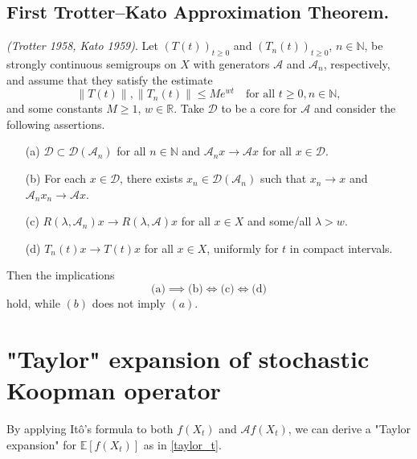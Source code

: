 \documentclass{article}[11]
\begin{document}
\subsection*{First Trotter--Kato Approximation Theorem.} 
\textit{(Trotter 1958, Kato 1959)}. Let $(T(t))_{t\geq0}$ and $(T_n(t))_{t\geq0}$, $n \in \mathbb{N}$, be strongly continuous semigroups on $X$ with generators $\mathcal{A}$ and $\mathcal{A}_n$, respectively, and assume that they satisfy the estimate
\[
\|T(t)\|, \|T_n(t)\| \leq Me^{wt} \quad \text{for all } t \geq 0, n \in \mathbb{N},
\]
and some constants $M \geq 1$, $w \in \mathbb{R}$. Take $\mathcal{D}$ to be a core for $\mathcal{A}$ and consider the following assertions.
\begin{itemize}
	\item[(a)] $\mathcal{D} \subset \mathcal{D}(\mathcal{A}_n)$ for all $n \in \mathbb{N}$ and $\mathcal{A}_n x \to \mathcal{A} x$ for all $x \in \mathcal{D}$.
	\item[(b)] For each $x \in \mathcal{D}$, there exists $x_n \in \mathcal{D}(\mathcal{A}_n)$ such that $x_n \to x$ and $\mathcal{A}_n x_n \to \mathcal{A} x$.
	\item[(c)] $R(\lambda, \mathcal{A}_n)x \to R(\lambda, \mathcal{A})x$ for all $x \in X$ and some/all $\lambda > w$.
	\item[(d)] $T_n(t)x \to T(t)x$ for all $x \in X$, uniformly for $t$ in compact intervals.
\end{itemize}
Then the implications
\[
\text{(a)} \implies \text{(b)} \iff \text{(c)} \iff \text{(d)}
\]
hold, while $(b)$ does not imply $(a)$.






\appendix
\newpage
\section{"Taylor" expansion of stochastic Koopman operator}\label{expansion_Ito_formula}
By applying It\^{o}'s formula to both \( f(X_t) \) and \( \mathcal{A} f(X_t) \), we can derive a "Taylor expansion" for \( \mathbb{E}[f(X_t)] \) as in \eqref{taylor_t}. 
\end{document}
